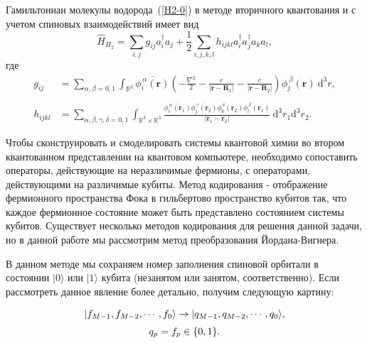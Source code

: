 \documentclass[a4paper]{report}
\begin{document}
Гамильтониан молекулы водорода~(\ref{H2-0}) в методе вторичного квантования и с учетом спиновых взаимодействий имеет вид
\begin{equation}\label{H2-1}
\hat {H}_{\!\scriptscriptstyle H_2} = \sum_{i,j}g_{ij}a^\dag_i a_j + \frac{1}{2}\sum_{i,j,k,l}h_{ijkl}a^\dag_i a^\dag_j a_ka_l,
\end{equation}
где
\begin{equation*}
\begin{aligned}
g_{ij}&= \sum\limits_{\alpha,\beta=0,1}\int_{\mathbb{R}^3} \overline{\phi_i^{\,\alpha}(\textbf{r})}\! \left(-\frac{\nabla^2}{2}
-\frac{e}{|\mathbf{r}-\mathbf{R}_1|}- \frac{e}{|\mathbf{r}-\mathbf{R}_2|}\right)\! \phi_j^{\:\!\beta}(\mathbf{r}) \:\!\mathrm{d}^3r,\\
\\
h_{ijkl}&= \sum\limits_{\alpha,\beta,\gamma,\delta=0,1} \int_{\mathbb{R}^3\times\mathbb{R}^3} \frac{\overline{\phi_i^{\,\alpha}(\textbf{r}_1)} \overline{\phi_j^{\,\gamma}(\textbf{r}_2)} \phi_k^{\,\delta}(\textbf{r}_2)  \phi_l^{\,\beta}(\textbf{r}_1)}{|\mathbf{r}_1-\mathbf{r}_2|} \:\mathrm{d}^3r_1 \mathrm{d}^3r_2.
\end{aligned}
\end{equation*}

Чтобы сконструировать и смоделировать системы квантовой химии во втором квантованном представлении на квантовом компьютере, необходимо сопоставить операторы, действующие на неразличимые фермионы, с операторами, действующими на различимые кубиты. Метод кодирования - отображение фермионного пространства Фока в гильбертово пространство кубитов так, что каждое фермионное состояние может быть представлено состоянием системы кубитов. Существует несколько методов кодирования для решения данной задачи, но в данной работе мы рассмотрим метод преобразования Йордана-Вигнера.

В данном методе мы сохраняем номер заполнения спиновой орбитали в состоянии ${|0\rangle}$ или ${|1\rangle}$ кубита (незанятом или занятом, соответственно). Если рассмотреть данное явление более детально, получим следующую картину:

    \begin{equation}\label{}
    \begin{array}{cc}
    \vspace{0,2cm}
    |f_{M-1},f_{M-2},\cdots,f_0\rangle\rightarrow|q_{M-1},q_{M-2},\cdots,q_0\rangle, \\
    q_p=f_p\in\{0,1\}.
    \nonumber
    \end{array}
    \end{equation}
\end{document}
